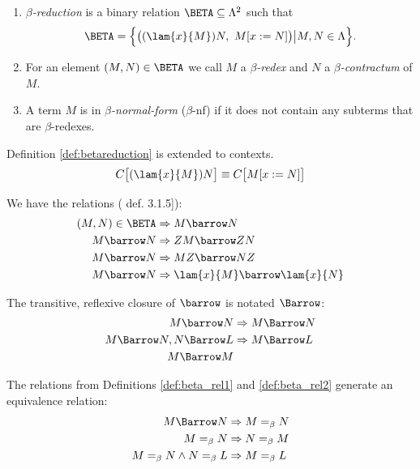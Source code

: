 \begin{definition}\label{def:betareduction}
	\begin{enumerate}
		\item \emph{$\beta$-reduction} is a binary relation $\BETA\subseteq\Lambda^2$ such that
		\begin{equation*}
			\BETA=\Big\{\big((\lam{x}{M})N,\ M[x:=N]\big)\big|M,N\in\Lambda\Big\}.
		\end{equation*}
		\item For an element $(M,N)\in\BETA$ we call $M$ a \emph{$\beta$-redex} and
		$N$ a \emph{$\beta$-contractum} of $M$.
		\item A term $M$ is in \emph{$\beta$-normal-form} ($\beta$-nf) if it 
		does not contain any subterms that are $\beta$-redexes.
	\end{enumerate}
\end{definition}
\begin{definition}
	Definition \ref{def:betareduction} is extended to contexts.
	\begin{align*}
		C\big[(\lam{x}{M})N\big]\equiv C\big[M[x:=N]\big]
	\end{align*}
\end{definition}
\begin{definition}\label{def:beta_rel1}
	We have the relations (\cite{Barendregt} def. 3.1.5]):
	\begin{align*}
		(M,N)\in\BETA&\Rightarrow M\barrow N \\
		M\barrow N &\Rightarrow ZM\barrow ZN \\
		M\barrow N &\Rightarrow MZ\barrow NZ \\
		M\barrow N &\Rightarrow \lam{x}{M}\barrow \lam{x}{N} 
	\end{align*}	
\end{definition}
\begin{definition}\label{def:beta_rel2}
	The transitive, reflexive closure of $\barrow$ is notated $\Barrow$:
	\begin{align*}
		M\barrow N &\Rightarrow M\Barrow N \\
		M\Barrow N, N\Barrow L &\Rightarrow M\Barrow L \\
		M\Barrow M & 
	\end{align*}
\end{definition}
\begin{definition}
	The relations from Definitions \ref{def:beta_rel1} and \ref{def:beta_rel2} 
	generate an equivalence relation:
	\begin{align*}
		M\Barrow N &\Rightarrow M=_\beta N \\
		M=_\beta N &\Rightarrow N=_\beta M \\
		M=_\beta N\wedge N=_\beta L&\Rightarrow M=_\beta L
	\end{align*}	
\end{definition}
